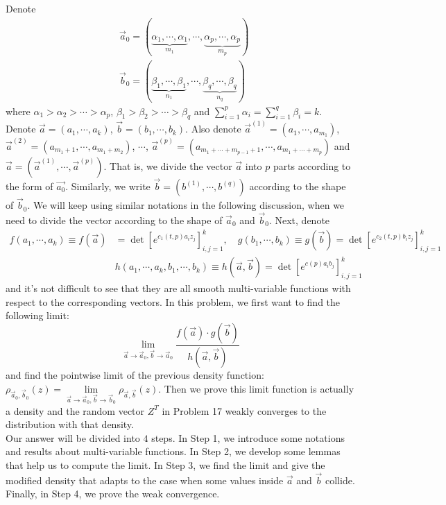 \documentclass[12pt]{article}
\begin{document}
Denote
\begin{align*}
	&\vec{a}_{0}=(\underbrace{\alpha_{1},\cdots,\alpha_{1}}_{m_{1}},\cdots,\underbrace{\alpha_{p},\cdots,\alpha_{p}}_{m_{p}})\\
	&\vec{b}_{0}=(\underbrace{\beta_{1},\cdots,\beta_{1}}_{n_{1}},\cdots,\underbrace{\beta_{q},\cdots,\beta_{q}}_{n_{q}})
\end{align*}
where $\alpha_{1}>\alpha_{2}>\cdots>\alpha_{p}$, $\beta_{1}>\beta_{2}>\cdots>\beta_{q}$ and $\sum_{i=1}^{p}\alpha_{i}=\sum_{i=1}^{q}\beta_{i}=k$. Denote $\vec{a}=(a_{1},\cdots,a_{k})$, $\vec{b}=(b_{1},\cdots,b_{k})$. Also denote $\vec{a}^{(1)}=(a_{1},\cdots,a_{m_1})$, $\vec{a}^{(2)}=(a_{m_{1}+1},\cdots,a_{m_1+m_2})$, $\cdots$, $\vec{a}^{(p)}=(a_{m_1+\cdots+m_{p-1}+1},\cdots, a_{m_1+\cdots+m_{p}})$ and $\vec{a}=(\vec{a}^{(1)},\cdots,\vec{a}^{(p)})$. That is, we divide the vector $\vec{a}$ into $p$ parts according to the form of $\vec{a_{0}}$. Similarly, we write $\vec{b}=(b^{(1)},\cdots,b^{(q)})$ according to the shape of $\vec{b}_{0}$. We will keep using similar notations in the following discussion, when we need to divide the vector according to the shape of $\vec{a}_{0}$ and $\vec{b}_{0}$. Next, denote
\begin{align*}
	f(a_{1},\cdots,a_{k})\equiv f(\vec{a})&=\det[e^{c_1(t,p)a_{i}z_{j}}]_{i,j=1}^{k},\quad g(b_{1},\cdots,b_{k})\equiv g(\vec{b})=\det[e^{c_2(t,p)b_{i}z_{j}}]_{i,j=1}^{k}\\
	&h(a_{1},\cdots,a_{k},b_{1},\cdots,b_{k})\equiv h(\vec{a},\vec{b})=\det[e^{c(p)a_{i}b_{j}}]_{i,j=1}^{k}
\end{align*} 
and it's not difficult to see that they are all smooth multi-variable functions with respect to the corresponding vectors. In this problem, we first want to find the following limit:
\begin{equation*}
	\lim_{\vec{a}\rightarrow \vec{a}_{0},\vec{b}\rightarrow \vec{a}_{0}} \frac{f(\vec{a})\cdot g(\vec{b})}{h(\vec{a},\vec{b})}
\end{equation*}
and find the pointwise limit of the previous density function: $\rho_{\vec{a}_{0},\vec{b}_{0}}(z)=\lim\limits_{\vec{a}\rightarrow\vec{a}_{0},\vec{b}\rightarrow\vec{b}_{0}}\rho_{\vec{a},\vec{b}}(z)$. Then we prove this limit function is actually a density and the random vector $Z^{T}$ in Problem 17 weakly converges to the distribution with that density.\\
Our answer will be divided into $4$ steps. In Step 1, we introduce some notations and results about multi-variable functions. In Step 2, we develop some lemmas that help us to compute the limit. In Step 3, we find the limit and give the modified density that adapts to the case when some values inside $\vec{a}$ and $\vec{b}$ collide. Finally, in Step 4, we prove the weak convergence.
\end{document}
